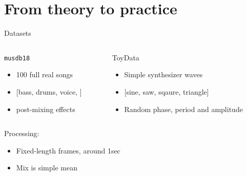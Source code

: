 \documentclass{beamer}
\begin{document}
    \section{From theory to practice}

    \begin{frame}{Datasets}
        \begin{columns}
            \begin{column}[T]{0.5\textwidth}
                \texttt{musdb18}
                \resizebox{0.8\textwidth}{!}{%
                    
                }%
                \begin{itemize}
                    \item 100 full real songs
                    \item{\small[bass, drums, voice, ]}
                    \item {} post-mixing effects
                \end{itemize}
            \end{column}
            \begin{column}[T]{0.5\textwidth}
                ToyData
                \resizebox{0.8\textwidth}{!}{%
                    
                }%
                \begin{itemize}
                    \item Simple synthesizer waves
                    \item{\small[sine, saw, sqaure, triangle]}
                    \item Random phase, period and amplitude
                \end{itemize}
            \end{column}
        \end{columns}

        \begin{center}
            Processing:
            \begin{itemize}
                \item Fixed-length frames, around 1sec
                \item Mix is simple mean
            \end{itemize}
        \end{center}
    \end{frame}
\end{document}
